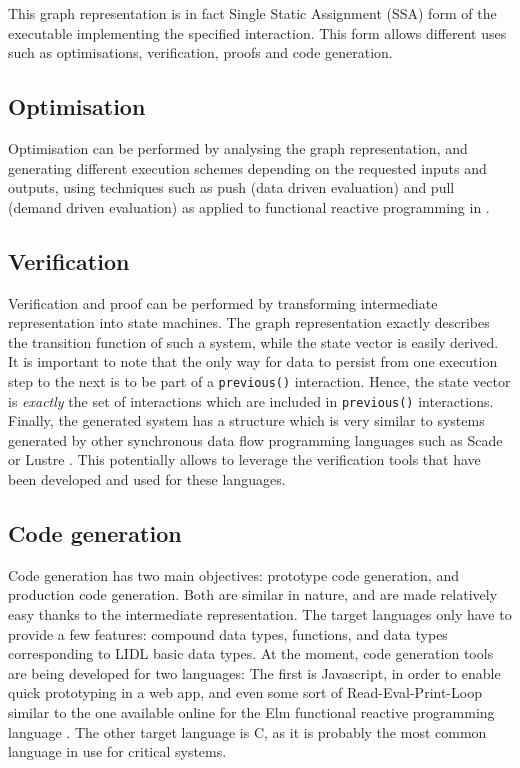 \documentclass[10pt]{sigplanconf}
\newcommand{\code}[1]{\lstinline{#1}}
\begin{document}
This graph representation is in fact Single Static Assignment (SSA) form \cite{cytron91efficiently} of the executable implementing the specified interaction. This form allows different uses such as optimisations, verification, proofs and code generation.

\subsection{Optimisation}

Optimisation can be performed by analysing the graph representation, and generating different execution schemes depending on the requested inputs and outputs, using techniques such as push (data driven evaluation) and pull (demand driven evaluation) as applied to functional reactive programming  in \cite{Elliott:2009:PFR:1596638.1596643}.

\subsection{Verification}

Verification and proof can be performed by transforming intermediate representation into state machines. The graph representation exactly describes the transition function of such a system, while the state vector is easily derived. It is important to note that the only way for data to persist from one execution step to the next is to be part of a \code{previous()} interaction. Hence, the state vector is \emph{exactly} the set of interactions which are included in \code{previous()} interactions. Finally, the generated system has a structure which is very similar to systems generated by other synchronous data flow programming languages such as Scade or Lustre \cite{halbwachs91}. This potentially allows to leverage the verification tools that have been developed and used for these languages.

\subsection{Code generation}

Code generation has two main objectives: prototype code generation, and production code generation. Both are similar in nature, and are made relatively easy thanks to the intermediate representation.  The target languages only have to provide a few features: compound data types, functions, and data types corresponding to LIDL basic data types. At the moment, code generation tools are being developed for two languages: The first is Javascript, in order to enable quick prototyping in a web app, and even some sort of Read-Eval-Print-Loop similar to the one available online for the Elm functional reactive programming language \cite{czaplicki2012elm}. The other target language is C, as it is probably the most common language in use for critical systems.
\end{document}
